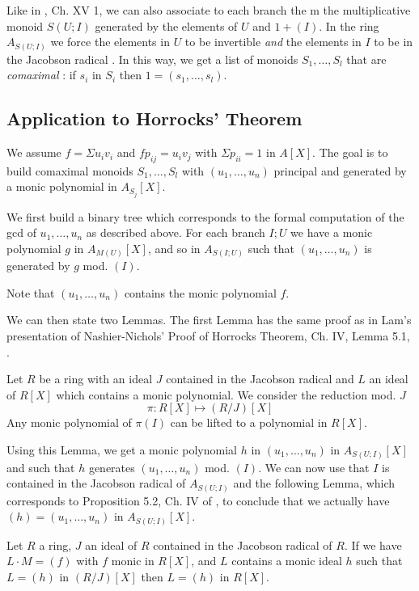 Like in \cite{lombardi-quitte}, Ch. XV 1, we can also associate to each branch the m
the multiplicative monoid $S(U;I)$ generated by the elements of $U$
and $1 + (I)$. In the ring $A_{S(U;I)}$ we force the elements in $U$ to be invertible {\em and} the elements
in $I$ to be in the Jacobson radical \cite{lombardi-quitte}.
In this way, we get a list of monoids $S_1,\dots,S_l$
that are {\em comaximal} \cite{lombardi-quitte}: if $s_i$ in $S_i$ then $1 = (s_1,\dots,s_l)$.

\subsection{Application to Horrocks' Theorem}

We assume $f = \Sigma u_iv_i$ and $fp_{ij} = u_iv_j$ with $\Sigma p_{ii} = 1$
in $A[X]$. The goal is to build comaximal monoids $S_1,\dots,S_l$ with $(u_1,\dots,u_n)$ principal
and generated by a monic polynomial in $A_{S_j}[X]$.

We first build a binary tree which corresponds to the formal computation of the gcd of
$u_1,\dots,u_n$ as described above. For each branch $I;U$ we have a monic polynomial
$g$ in $A_{M(U)}[X]$, and so in $A_{S(I;U)}$ such that $(u_1,\dots,u_n)$ is generated
by $g$ mod. $(I)$.

Note that $(u_1,\dots,u_n)$ contains the monic polynomial $f$.

We can then state two Lemmas. The first Lemma has the same proof as in Lam's presentation
of Nashier-Nichols' Proof of Horrocks Theorem, Ch. IV, Lemma 5.1, \cite{Lam}.

\begin{lemma}
  Let $R$ be a ring with an ideal $J$ contained in the Jacobson radical
  and $L$ an ideal of $R[X]$ which contains a monic polynomial. We consider
  the reduction mod. $J$
  $$\pi: R[X]\mapsto (R/J)[X]$$
  Any monic polynomial of $\pi(I)$ can be lifted to a polynomial in $R[X]$.
\end{lemma}

 Using this Lemma, we get a monic polynomial $h$ in $(u_1,\dots,u_n)$ in $A_{S(U;I)}[X]$
 and such that $h$ generates $(u_1,\dots,u_n)$ mod. $(I)$.
 We can now use that $I$ is contained in the Jacobson radical of $A_{S(U;I)}$ and the
 following Lemma, which corresponds to Proposition 5.2, Ch. IV of \cite{Lam},
 to conclude that we actually have $(h) = (u_1,\dots,u_n)$
 in $A_{S(U;I)}[X]$.

\begin{lemma}
  Let $R$ a ring, $J$ an ideal of $R$ contained in the Jacobson radical of $R$. If
  we have $L\cdot M = (f)$ with $f$ monic in $R[X]$, and $L$ contains a monic ideal
  $h$ such that $L = (h)$ in $(R/J)[X]$ then $L = (h)$ in $R[X]$.
\end{lemma}

